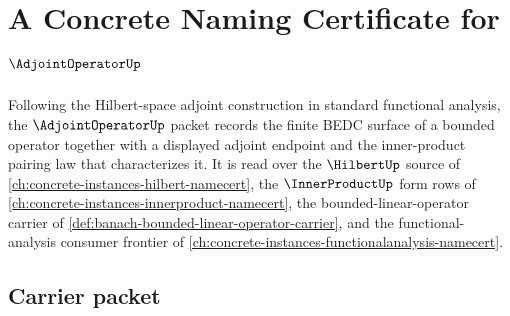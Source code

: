 \chapter{A Concrete Naming Certificate for $\AdjointOperatorUp$}
\label{ch:concrete-instances-adjointoperator-namecert}

Following the Hilbert-space adjoint construction in standard functional analysis, the $\AdjointOperatorUp$ packet records the finite BEDC surface of a bounded operator together with a displayed adjoint endpoint and the inner-product pairing law that characterizes it. It is read over the $\HilbertUp$ source of \autoref{ch:concrete-instances-hilbert-namecert}, the $\InnerProductUp$ form rows of \autoref{ch:concrete-instances-innerproduct-namecert}, the bounded-linear-operator carrier of \autoref{def:banach-bounded-linear-operator-carrier}, and the functional-analysis consumer frontier of \autoref{ch:concrete-instances-functionalanalysis-namecert}.

\section{Carrier packet}
\label{sec:adjoint-operator-carrier}

